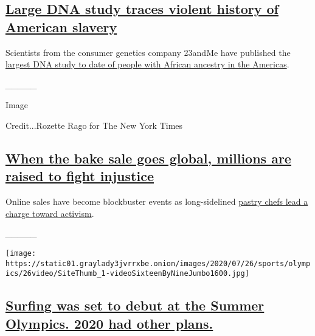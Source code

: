 \hypertarget{large-dna-study-traces-violent-history-of-american-slavery}{%
\subsection{\texorpdfstring{\href{https://www.nytimes3xbfgragh.onion/2020/07/23/science/23andme-african-ancestry.html}{Large
DNA study traces violent history of American
slavery}}{Large DNA study traces violent history of American slavery}}\label{large-dna-study-traces-violent-history-of-american-slavery}}

Scientists from the consumer genetics company 23andMe have published the
\href{https://www.nytimes3xbfgragh.onion/2020/07/23/science/23andme-african-ancestry.html}{largest
DNA study to date of people with African ancestry in the Americas}.

\emph{\_\_\_\_\_}

Image

Credit...Rozette Rago for The New York Times

\hypertarget{when-the-bake-sale-goes-global-millions-are-raised-to-fight-injustice}{%
\subsection{\texorpdfstring{\href{https://www.nytimes3xbfgragh.onion/2020/07/21/dining/bake-sale-activism-racism.html}{When
the bake sale goes global, millions are raised to fight
injustice}}{When the bake sale goes global, millions are raised to fight injustice}}\label{when-the-bake-sale-goes-global-millions-are-raised-to-fight-injustice}}

Online sales have become blockbuster events as long-sidelined
\href{https://www.nytimes3xbfgragh.onion/2020/07/21/dining/bake-sale-activism-racism.html}{pastry
chefs lead a charge toward activism}.

\emph{\_\_\_\_\_}

\texttt{[image: https://static01.graylady3jvrrxbe.onion/images/2020/07/26/sports/olympics/26video/SiteThumb\_1-videoSixteenByNineJumbo1600.jpg]}

\hypertarget{surfing-was-set-to-debut-at-the-summer-olympics-2020-had-other-plans}{%
\subsection{\texorpdfstring{\href{https://www.nytimes3xbfgragh.onion/video/sports/olympics/100000007219144/summer-olympics.html}{Surfing
was set to debut at the Summer Olympics. 2020 had other
plans.}}{Surfing was set to debut at the Summer Olympics. 2020 had other plans.}}\label{surfing-was-set-to-debut-at-the-summer-olympics-2020-had-other-plans}}

